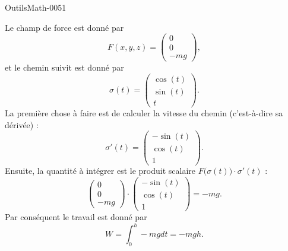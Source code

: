 
\begin{corrige}{OutilsMath-0051}

    Le champ de force est donné par
    \begin{equation}
        F(x,y,z)=\begin{pmatrix}
            0    \\ 
            0    \\ 
            -mg    
        \end{pmatrix},
    \end{equation}
    et le chemin suivit est donné par 
    \begin{equation}
        \sigma(t)=\begin{pmatrix}
            \cos(t)    \\ 
            \sin(t)    \\ 
            t    
        \end{pmatrix}.
    \end{equation}
    La première chose à faire est de calculer la vitesse du chemin (c'est-à-dire sa dérivée) :
    \begin{equation}
        \sigma'(t)=\begin{pmatrix}
            -\sin(t)    \\ 
            \cos(t)    \\ 
            1    
        \end{pmatrix}.
    \end{equation}
    Ensuite, la quantité à intégrer est le produit scalaire $F\big( \sigma(t) \big)\cdot\sigma'(t)$ :
    \begin{equation}
        \begin{pmatrix}
            0    \\ 
            0    \\ 
            -mg    
        \end{pmatrix}\cdot\begin{pmatrix}
            -\sin(t)    \\ 
            \cos(t)    \\ 
            1    
        \end{pmatrix}=-mg.
    \end{equation}
    Par conséquent le travail est donné par
    \begin{equation}
        W=\int_0^h-mg dt=-mgh.
    \end{equation}

\end{corrige}
